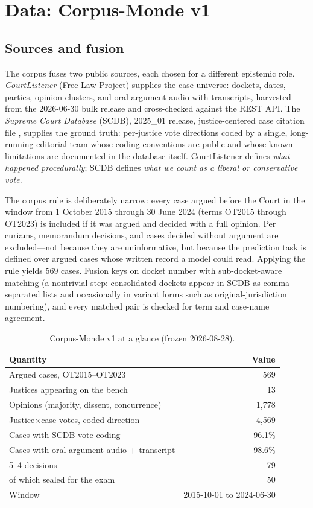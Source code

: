 \section{Data: Corpus-Monde v1}\label{sec:data}

\subsection{Sources and fusion}

The corpus fuses two public sources, each chosen for a different
epistemic role. \emph{CourtListener} (Free Law Project)
\citep{courtlistener} supplies the case universe: dockets, dates,
parties, opinion clusters, and oral-argument audio with transcripts,
harvested from the 2026-06-30 bulk release and cross-checked against
the REST API. The \emph{Supreme Court Database} (SCDB), 2025\_01
release, justice-centered case citation file \citep{spaeth2025},
supplies the ground truth: per-justice vote directions coded by a
single, long-running editorial team whose coding conventions are
public and whose known limitations are documented in the database
itself. CourtListener defines \emph{what happened procedurally};
SCDB defines \emph{what we count as a liberal or conservative vote}.

The corpus rule is deliberately narrow: every case argued before the
Court in the window from 1 October 2015 through 30 June 2024 (terms
OT2015 through OT2023) is included if it was argued and decided with
a full opinion. Per curiams, memorandum decisions, and cases decided
without argument are excluded---not because they are uninformative,
but because the prediction task is defined over argued cases whose
written record a model could read. Applying the rule yields 569
cases. Fusion keys on docket number with sub-docket-aware matching
(a nontrivial step: consolidated dockets appear in SCDB as
comma-separated lists and occasionally in variant forms such as
original-jurisdiction numbering), and every matched pair is checked
for term and case-name agreement.

\begin{table}[t]
\centering
\caption{Corpus-Monde v1 at a glance (frozen 2026-08-28).}
\label{tab:corpus}
\small
\begin{tabular}{@{}lr@{}}
\toprule
Quantity & Value \\
\midrule
Argued cases, OT2015--OT2023 & 569 \\
Justices appearing on the bench & 13 \\
Opinions (majority, dissent, concurrence) & 1{,}778 \\
Justice$\times$case votes, coded direction & 4{,}569 \\
Cases with SCDB vote coding & 96.1\% \\
Cases with oral-argument audio + transcript & 98.6\% \\
5--4 decisions & 79 \\
\quad of which sealed for the exam & 50 \\
Window & 2015-10-01 to 2024-06-30 \\
\bottomrule
\end{tabular}
\end{table}

